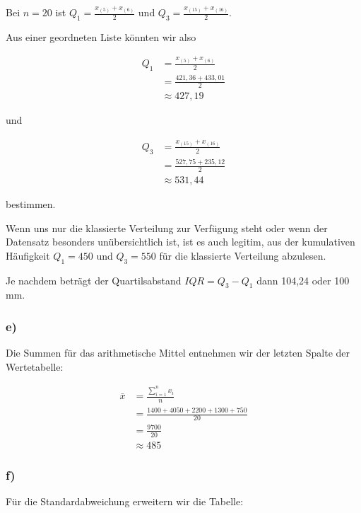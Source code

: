 \documentclass[
  11pt,
  ngerman,
  a4paper,
]{report}
\begin{document}
Bei \(n=20\) ist \(Q_1=\frac{x_{(5)}+x_{(6)}}{2}\) und \(Q_3=\frac{x_{(15)}+x_{(16)}}{2}\).

Aus einer geordneten Liste könnten wir also

\[\begin{aligned}
Q_1&=\frac{x_{(5)}+x_{(6)}}{2}\\
   &=\frac{421{,}36+433{,}01}{2}\\
   &\approx427{,}19
\end{aligned}\]

und

\[\begin{aligned}
Q_3&=\frac{x_{(15)}+x_{(16)}}{2}\\
   &=\frac{527{,}75+235{,}12}{2}\\
   &\approx531{,}44
\end{aligned}\]

bestimmen.

Wenn uns nur die klassierte Verteilung zur Verfügung steht oder wenn der Datensatz besonders unübersichtlich ist, ist es auch legitim, aus der kumulativen Häufigkeit \(Q_1=450\) und \(Q_3=550\) für die klassierte Verteilung abzulesen.

Je nachdem beträgt der Quartilsabstand \(\mathit{IQR}=Q_3-Q_1\) dann 104,24 oder 100 mm.

\hypertarget{e}{%
\subsubsection{e)}\label{e}}

Die Summen für das arithmetische Mittel entnehmen wir der letzten Spalte der Wertetabelle:

\[\begin{aligned}
  \bar{x}&=\frac{\sum\limits_{i=1}^nx_i}{n} \\
         &=\frac{1400+4050+2200+1300+750}{20} \\
         &=\frac{9700}{20} \\
         &\approx485
\end{aligned}\]

\hypertarget{f}{%
\subsubsection{f)}\label{f}}

Für die Standardabweichung erweitern wir die Tabelle:
\end{document}

